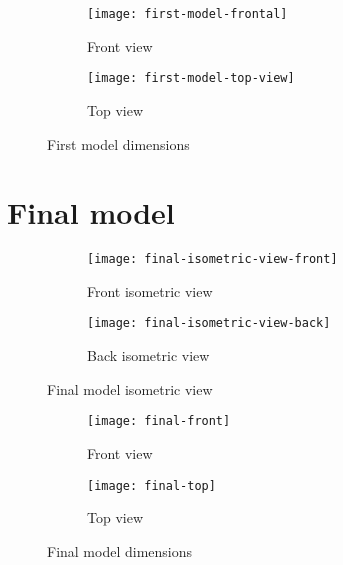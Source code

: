 \begin{figure}
    \centering
    \begin{subfigure}[b]{0.272\textwidth}
        \texttt{[image: first-model-frontal]}
        \caption{Front view}
        \label{fig:first-model-frontal}
    \end{subfigure}
    \begin{subfigure}[b]{0.628\textwidth}
        \texttt{[image: first-model-top-view]}
        \caption{Top view}
        \label{fig:first-model-top-view}
    \end{subfigure}
    \caption{First model dimensions}
    \label{fig:first-model-dimensions}
\end{figure}

\section{Final model}

\begin{figure}
    \centering
    \begin{subfigure}[b]{0.4\textwidth}
        \texttt{[image: final-isometric-view-front]}
        \caption{Front isometric view}
        \label{fig:final-front-isometric-view}
    \end{subfigure}
    \begin{subfigure}[b]{0.4\textwidth}
        \texttt{[image: final-isometric-view-back]}
        \caption{Back isometric view}
        \label{fig:final-back-isometric-view}
    \end{subfigure}
    \caption{Final model isometric view}
    \label{fig:final-isometric-view}
\end{figure}

\begin{figure}
    \centering
    \begin{subfigure}[b]{0.316\textwidth}
        \texttt{[image: final-front]}
        \caption{Front view}
        \label{fig:final-frontal}
    \end{subfigure}
    \begin{subfigure}[b]{0.584\textwidth}
        \texttt{[image: final-top]}
        \caption{Top view}
        \label{fig:first-top}
    \end{subfigure}
    \caption{Final model dimensions}
    \label{fig:final-model-dimensions}
\end{figure}

